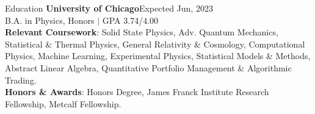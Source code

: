 \documentclass{resume} %
\begin{document}
\vspace{-0.6em}
\begin{rSection}{Education}
{\bf University of Chicago}\hfill {Expected Jun, 2023}\\
B.A. in Physics, Honors $|$ GPA 3.74/4.00
\smallskip\\
\textbf{Relevant Coursework}: Solid State Physics, Adv. Quantum Mechanics, Statistical \& Thermal Physics, General Relativity \& Cosmology, Computational Physics, Machine Learning, Experimental Physics, Statistical Models \& Methods, Abstract Linear Algebra, Quantitative Portfolio Management \& Algorithmic Trading.
\smallskip\\
\textbf{Honors \& Awards}: Honors Degree, James Franck Institute Research Fellowship, Metcalf Fellowship.


\end{rSection}
\end{document}
